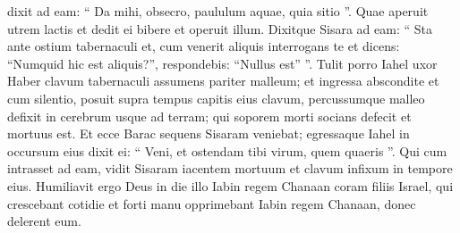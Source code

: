 \begin{biblechapter}
\begin{biblechapter}
\begin{biblechapter}
\begin{biblechapter}
\verse dixit ad eam: “ Da mihi, obsecro, paululum aquae, quia sitio ”. Quae aperuit utrem lactis et dedit ei bibere et operuit illum. 
\verse Dixitque Sisara ad eam: “ Sta ante ostium tabernaculi et, cum venerit aliquis interrogans te et dicens: “Numquid hic est aliquis?”, respondebis: “Nullus est” ”. 
\verse Tulit porro Iahel uxor Haber clavum tabernaculi assumens pariter malleum; et ingressa abscondite et cum silentio, posuit supra tempus capitis eius clavum, percussumque malleo defixit in cerebrum usque ad terram; qui soporem morti socians defecit et mortuus est. 
\verse Et ecce Barac sequens Sisaram veniebat; egressaque Iahel in occursum eius dixit ei: “ Veni, et ostendam tibi virum, quem quaeris ”. Qui cum intrasset ad eam, vidit Sisaram iacentem mortuum et clavum infixum in tempore eius.
 \verse Humiliavit ergo Deus in die illo Iabin regem Chanaan coram filiis Israel, 
 \verse qui crescebant cotidie et forti manu opprimebant Iabin regem Chanaan, donec delerent eum.
 

\end{biblechapter}
\end{biblechapter}
\end{biblechapter}
\end{biblechapter}
